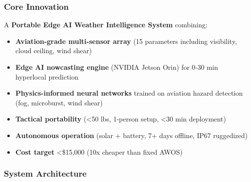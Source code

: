 \subsubsection{Core Innovation}
A \textcolor{innovationcolor}{\textbf{Portable Edge AI Weather Intelligence System}} combining:
\begin{itemize}
    \item \textbf{Aviation-grade multi-sensor array} (15 parameters including visibility, cloud ceiling, wind shear)
    \item \textbf{Edge AI nowcasting engine} (NVIDIA Jetson Orin) for 0-30 min hyperlocal prediction
    \item \textbf{Physics-informed neural networks} trained on aviation hazard detection (fog, microburst, wind shear)
    \item \textbf{Tactical portability} (<50 lbs, 1-person setup, <30 min deployment)
    \item \textbf{Autonomous operation} (solar + battery, 7+ days offline, IP67 ruggedized)
    \item \textbf{Cost target} <\$15,000 (10x cheaper than fixed AWOS)
\end{itemize}

\subsubsection{System Architecture}


